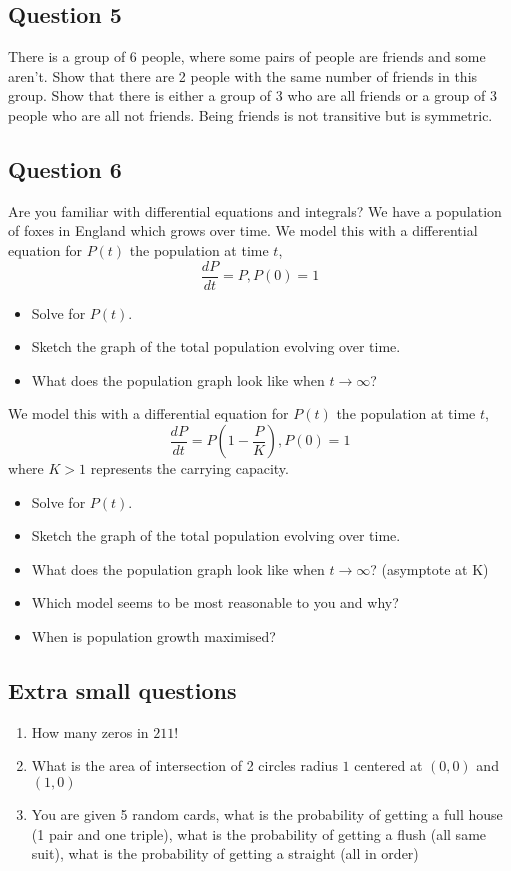 \documentclass{article}
\begin{document}
\subsection{Question 5}
There is a group of 6 people, where some pairs of people are friends and some aren't.
Show that there are 2 people with the same number of friends in this group.
Show that there is either a group of 3 who are all friends or a group of 3 people who are all not friends.
Being friends is not transitive but is symmetric.

\subsection{Question 6}
Are you familiar with differential equations and integrals?
We have a population of foxes in England which grows over time.
We model this with a differential equation for $P(t)$ the population at time $t$,
\begin{equation}
    \frac{dP}{dt}=P, P(0)=1
\end{equation}
\begin{itemize}
    \item Solve for $P(t)$.
    \item Sketch the graph of the total population evolving over time.
    \item What does the population graph look like when $t\rightarrow\infty$?
\end{itemize}

We model this with a differential equation for $P(t)$ the population at time $t$,
\begin{equation}
    \frac{dP}{dt}=P(1-\frac{P}{K}), P(0)=1
\end{equation}
where $K>1$ represents the carrying capacity.

\begin{itemize}
    \item Solve for $P(t)$.
    \item Sketch the graph of the total population evolving over time.
    \item What does the population graph look like when $t\rightarrow\infty$? (asymptote at K)
    \item Which model seems to be most reasonable to you and why?
    \item When is population growth maximised?
\end{itemize}

\subsection{Extra small questions}
\begin{enumerate}
    \item How many zeros in $211!$
    \item What is the area of intersection of 2 circles radius $1$ centered at $(0,0)$ and $(1,0)$
    \item You are given 5 random cards, what is the probability of getting a full house (1 pair and one triple), what is the probability of getting a flush (all same suit), what is the probability of getting a straight (all in order)
\end{enumerate}
\end{document}

